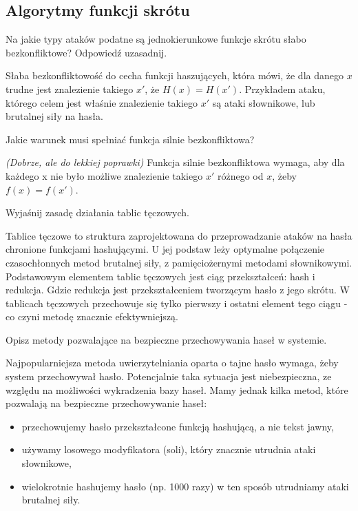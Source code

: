 \documentclass[answers,11pt]{exam}
\newcommand{\fixit}{\textit{(Dobrze, ale do lekkiej poprawki)} }
\begin{document}
\subsection{Algorytmy funkcji skrótu}
\begin{questions}

\question Na jakie typy ataków podatne są jednokierunkowe funkcje skrótu słabo bezkonfliktowe? Odpowiedź uzasadnij.
\begin{solution}
Słaba bezkonfliktowość do cecha funkcji haszujących, która mówi, że dla danego $x$ trudne jest znalezienie takiego $x'$, że $H(x) = H(x')$.
Przykładem ataku, którego celem jest właśnie znalezienie takiego $x'$ są ataki słownikowe, lub brutalnej siły na hasła.
\end{solution}

\question Jakie warunek musi spełniać funkcja silnie bezkonfliktowa?
\begin{solution}
\fixit
Funkcja silnie bezkonfliktowa wymaga, aby dla każdego x nie było możliwe znalezienie takiego $x'$ różnego od $x$, żeby $f(x) = f(x')$.
\end{solution}

\question Wyjaśnij zasadę działania tablic tęczowych.
\begin{solution}
Tablice tęczowe to struktura zaprojektowana do przeprowadzanie ataków na hasła chronione funkcjami hashującymi. U jej podstaw leży optymalne połączenie czasochłonnych metod brutalnej siły, z pamięciożernymi metodami słownikowymi. Podstawowym elementem tablic tęczowych jest ciąg przekształceń: hash i redukcja. Gdzie redukcja jest przekształceniem tworzącym hasło z jego skrótu. W tablicach tęczowych przechowuje się tylko pierwszy i ostatni element tego ciągu - co czyni metodę znacznie efektywniejszą.
\end{solution}

\question Opisz metody pozwalające na bezpieczne przechowywania haseł w systemie.
\begin{solution}
Najpopularniejsza metoda uwierzytelniania oparta o tajne hasło wymaga, żeby system przechowywał hasło. Potencjalnie taka sytuacja jest niebezpieczna, ze względu na możliwości wykradzenia bazy haseł. Mamy jednak kilka metod, które pozwalają na bezpieczne przechowywanie haseł:
\begin{itemize}
\item przechowujemy hasło przekształcone funkcją hashującą, a nie tekst jawny,
\item używamy losowego modyfikatora (soli), który znacznie utrudnia ataki słownikowe,
\item wielokrotnie hashujemy hasło (np. 1000 razy) w ten sposób utrudniamy ataki brutalnej siły.
\end{itemize}
\end{solution}


\end{questions}
\end{document}
